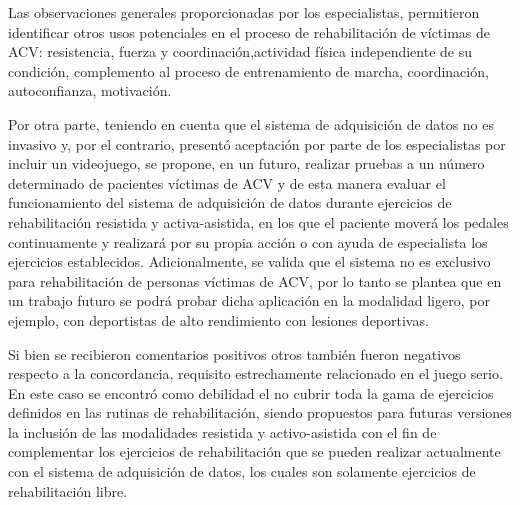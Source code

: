 Las observaciones generales proporcionadas por los especialistas, permitieron identificar otros usos potenciales en el proceso de rehabilitación de víctimas de ACV: resistencia, fuerza y coordinación,actividad física independiente de su condición, complemento al proceso de entrenamiento de marcha, coordinación, autoconfianza, motivación.

Por otra parte, teniendo en cuenta que el sistema de adquisición de datos no es invasivo y, por el contrario, presentó aceptación por parte de los especialistas por incluir un videojuego, se propone, en un futuro, realizar pruebas a un número determinado de pacientes víctimas de ACV y de esta manera evaluar el funcionamiento del sistema de adquisición de datos durante ejercicios de rehabilitación resistida y activa-asistida, en los que el paciente moverá los pedales continuamente y realizará por su propia acción o con ayuda de especialista los ejercicios establecidos. Adicionalmente, se valida que el sistema no es exclusivo para rehabilitación de personas víctimas de ACV, por lo tanto se plantea que en un trabajo futuro se podrá probar dicha aplicación en la modalidad ligero, por ejemplo, con deportistas de alto rendimiento con lesiones deportivas.

Si bien se recibieron comentarios  positivos otros también fueron negativos respecto a la concordancia, requisito estrechamente relacionado en el juego serio. En este caso se encontró como debilidad el no cubrir toda la gama de ejercicios definidos en las rutinas de rehabilitación, siendo propuestos para futuras versiones la inclusión de las modalidades resistida y activo-asistida con el fin de complementar los ejercicios de rehabilitación que se pueden realizar actualmente con el sistema de adquisición de datos, los cuales son solamente ejercicios de rehabilitación libre.
